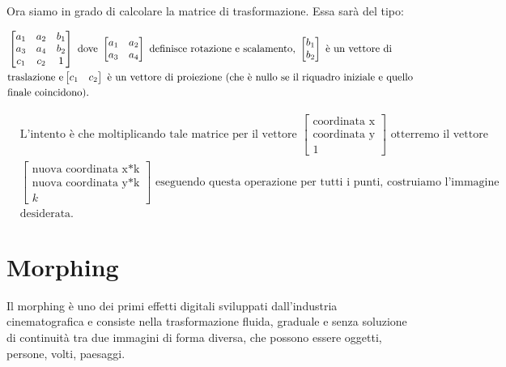 \vspace{1em} \noindent
Ora siamo in grado di calcolare la matrice di trasformazione. Essa sarà del tipo:

\begin{align*}
&\begin{bmatrix}
a_1&a_2&b_1\\
a_3&a_4&b_2\\
c_1&c_2&1
\end{bmatrix}
\text{ dove }
\begin{bmatrix}
a_1&a_2\\
a_3&a_4
\end{bmatrix}
\text{ definisce rotazione e scalamento, } 
\begin{bmatrix}
b_1\\
b_2
\end{bmatrix}
\text{ è un vettore di}\\
&\text{traslazione e} 
\newline
\begin{bmatrix}
c_1&c_2
\end{bmatrix}
\text{ è un vettore di proiezione (che è nullo se il riquadro iniziale e quello}\\
&\text{finale coincidono).}\\
\end{align*}

\vspace{-3em}

\begin{align*}
&\text{L'intento è che moltiplicando tale matrice per il vettore  }
\begin{bmatrix}
\text{coordinata x}\\
\text{coordinata y}\\
1
\end{bmatrix}
\text{ otterremo il vettore}\\
&\begin{bmatrix}
\text{nuova coordinata x*k}\\
\text{nuova coordinata y*k}\\
k
\end{bmatrix}
\text{ eseguendo questa operazione per tutti i punti, costruiamo l'immagine}\\
&\text{desiderata.}
\end{align*}

\section{Morphing}
Il morphing è uno dei primi effetti digitali sviluppati dall'industria cinematografica e consiste nella trasformazione fluida, graduale e senza soluzione di continuità tra due immagini di forma diversa, che possono essere oggetti, persone, volti, paesaggi.

